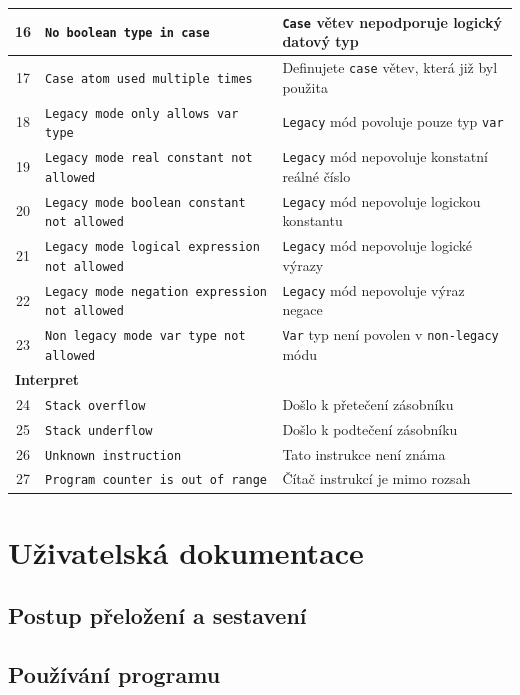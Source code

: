 \documentclass[
12pt,
a4paper,
pdftex,
czech,
titlepage
]{report}
\begin{document}
\begin{longtable}{|c|p{5.5cm}|p{6.5cm}|}
\rule{0pt}{3ex}16 & \texttt{No boolean type in case} & \texttt{Case} větev nepodporuje logický datový typ \\ \hline
\rule{0pt}{3ex}17 & \texttt{Case atom used multiple times} & Definujete \texttt{case} větev, která již byl použita \\ \hline
\rule{0pt}{3ex}18 & \texttt{Legacy mode only allows var type} & \texttt{Legacy} mód povoluje pouze typ \texttt{var} \\ \hline
\rule{0pt}{3ex}19 & \texttt{Legacy mode real constant not allowed} & \texttt{Legacy} mód nepovoluje konstatní reálné číslo \\ \hline
\rule{0pt}{3ex}20 & \texttt{Legacy mode boolean constant not allowed} & \texttt{Legacy} mód nepovoluje logickou konstantu \\ \hline
\rule{0pt}{3ex}21 & \texttt{Legacy mode logical expression not allowed} & \texttt{Legacy} mód nepovoluje logické výrazy \\ \hline
\rule{0pt}{3ex}22 & \texttt{Legacy mode negation expression not allowed} & \texttt{Legacy} mód nepovoluje výraz negace \\ \hline
\rule{0pt}{3ex}23 & \texttt{Non legacy mode var type not allowed} & \texttt{Var} typ není povolen v \texttt{non-legacy} módu \\ \hline
\multicolumn{3}{|l|}{\textbf{Interpret}}\\ \hline
\rule{0pt}{3ex}24 & \texttt{Stack overflow} & Došlo k přetečení zásobníku \\ \hline
\rule{0pt}{3ex}25 & \texttt{Stack underflow} & Došlo k podtečení zásobníku \\ \hline
\rule{0pt}{3ex}26 & \texttt{Unknown instruction} & Tato instrukce není známa \\ \hline
\rule{0pt}{3ex}27 & \texttt{Program counter is out of range} & Čítač instrukcí je mimo rozsah \\ \hline
\end{longtable}


 

\chapter{Uživatelská dokumentace} 

\section{Postup přeložení a sestavení}

\section{Používání programu}
\end{document}
